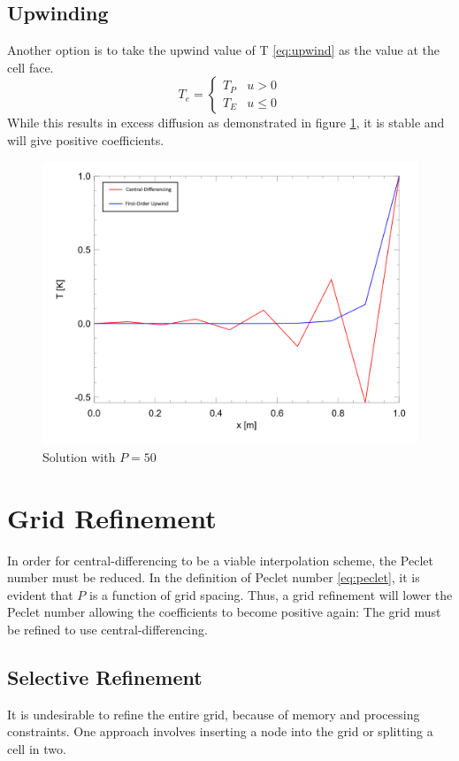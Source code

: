 \documentclass[12pt,twocolumn]{article}
\begin{document}
\subsection*{Upwinding}
Another option is to take the upwind value of T \eqref{eq:upwind} as the value at the cell face.
\begin{equation}\label{eq:upwind}T_e = \begin{cases}T_P & u>0\\T_E & u\leq 0\end{cases} \end{equation}
While this results in excess diffusion as demonstrated in figure \ref{fig:solution}, it is stable and will give positive coefficients.

\begin{figure}
\includegraphics[width=\columnwidth]{plots/solution.png}
\caption{Solution with $P = 50$}
\label{fig:solution}
\end{figure}

\section*{Grid Refinement}
In order for central-differencing to be a viable interpolation scheme, the Peclet number must be reduced.
In the definition of Peclet number \eqref{eq:peclet}, it is evident that $P$ is a function of grid spacing.
Thus, a grid refinement will lower the Peclet number allowing the coefficients to become positive again:
The grid must be refined to use central-differencing.
\subsection*{Selective Refinement}
It is undesirable to refine the entire grid, because of memory and processing constraints.
One approach involves inserting a node into the grid or splitting a cell in two.
\end{document}
